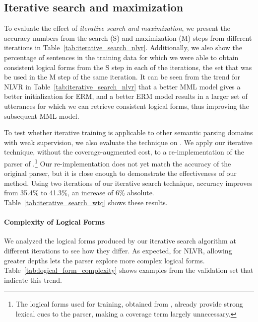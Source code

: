 \subsection{Iterative search and maximization} \label{sec:results_iterative}
To evaluate the effect of \textit{iterative search and maximization}, we present the accuracy numbers from the search (S) and maximization (M) steps from different iterations in Table~\ref{tab:iterative_search_nlvr}. Additionally, we also show the percentage of sentences in the training data for which we were able to obtain consistent logical forms from the S step in each of the iterations, the set that was be used in the M step of the same iteration. It can be seen from the trend for NLVR in Table~\ref{tab:iterative_search_nlvr} that a better MML model gives a better initialization for ERM, and a better ERM model results in a larger set of utterances for which we can retrieve consistent logical forms, thus improving the subsequent MML model.

To test whether iterative training is applicable to other semantic parsing domains with weak supervision, we also evaluate the technique on \WTQ. We apply our iterative technique, without the coverage-augmented cost, to a re-implementation of the parser of \citet{krishnamurthy2017neural}.\footnote{The logical forms used for training, obtained from \citet{pasupat2016inferring}, already provide strong lexical cues to the parser, making a coverage term largely unnecessary.}  Our re-implementation does not yet match the accuracy of the original parser, but it is close enough to demonstrate the effectiveness of our method.  Using two iterations of our iterative search technique, accuracy improves from 35.4\% to 41.3\%, an increase of 6\% absolute.  Table~\ref{tab:iterative_search_wtq} shows these results.

\paragraph{Complexity of Logical Forms} We analyzed the logical forms produced by our iterative search algorithm at different iterations to see how they differ. As expected, for NLVR, allowing greater depths lets the parser explore more complex logical forms. Table~\ref{tab:logical_form_complexity} shows examples from the validation set that indicate this trend.

